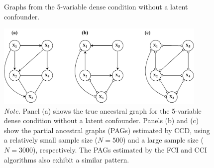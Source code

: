 \documentclass[twoside, 11pt]{article}
\newcommand*{\figref}[2][]{%
  \hyperref[{fig:#2}]{%
    Figure~\ref*{fig:#2}%
    \ifx\\#1\\%
    \else
      #1%
    \fi
  }%
}
\begin{document}
\begin{appendices}


\begin{figure}[!t]
    \centering
        \caption{Graphs from the 5-variable dense condition without a latent confounder.}
        \includegraphics[width=0.9\textwidth]{figures/FigF1.pdf}
        \vspace{3mm}
        \caption*{\small{\textit{Note.} Panel (a) shows the true ancestral graph for the 5-variable dense condition without a latent confounder. Panels (b) and (c) show the partial ancestral graphs (PAGs) estimated by CCD, using a relatively small sample size ($N = 500$) and a large sample size ($N = 3000$), respectively. The PAGs estimated by the FCI and CCI algorithms also exhibit a similar pattern.}} 
    \label{fig:F1}
\end{figure}


\end{appendices}
\end{document}
